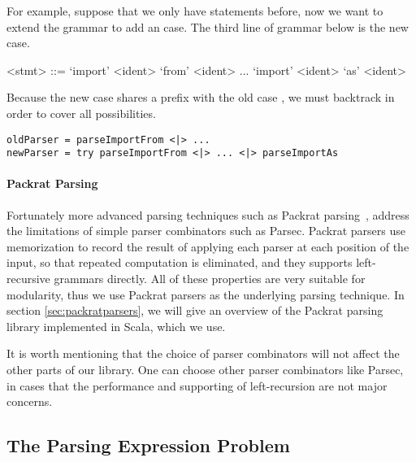 For example, suppose that we only have  statements before, now we want to extend the grammar to add an  case. The third line of grammar below is the new case.

\setlength{\grammarindent}{5em}
\begin{grammar}
<stmt> ::= `import' <ident> `from' <ident>
    \alt ...
    \alt `import' <ident> `as' <ident>
\end{grammar}

Because the new case  shares a prefix with the old case , we must backtrack in order to cover all possibilities.

\begin{lstlisting}[language=PlainCode]
oldParser = parseImportFrom <|> ...
newParser = try parseImportFrom <|> ... <|> parseImportAs
\end{lstlisting}

\paragraph{Packrat Parsing}
Fortunately more advanced parsing techniques such as Packrat
parsing~\cite{}, address the limitations of simple parser combinators
such as Parsec. Packrat parsers use
memorization to record the result of applying each parser at each
position of the input, so that repeated computation is eliminated, and
they supports left-recursive grammars directly. All of these properties are very
suitable for modularity, thus we use Packrat parsers as the underlying
parsing technique. In section \ref{sec:packratparsers}, we will give
an overview of the Packrat parsing library implemented in Scala,
which we use.

It is worth mentioning that the choice of parser combinators will not
affect the other parts of our library. One can choose other parser
combinators like Parsec, in cases that the performance and supporting
of left-recursion are not major concerns.

\subsection{The Parsing Expression Problem}

